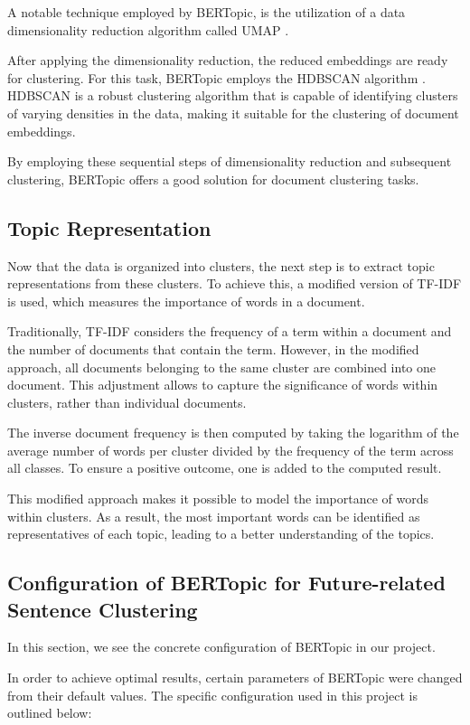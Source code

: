 \documentclass[a4paper,10pt]{report}
\begin{document}
A notable technique employed by BERTopic, is the utilization of a data dimensionality reduction algorithm called UMAP \cite{umap}.

After applying the dimensionality reduction, the reduced embeddings are ready for clustering. For this task, BERTopic employs the HDBSCAN algorithm \cite{hdbscan}. HDBSCAN is a robust clustering algorithm that is capable of identifying clusters of varying densities in the data, making it suitable for the clustering of document embeddings.

By employing these sequential steps of dimensionality reduction and subsequent clustering, BERTopic offers a good solution for document clustering tasks. \cite{bertopic}

\subsection{Topic Representation}
Now that the data is organized into clusters, the next step is to extract topic representations from these clusters. To achieve this, a modified version of TF-IDF is used, which measures the importance of words in a document.

Traditionally, TF-IDF considers the frequency of a term within a document and the number of documents that contain the term. However, in the modified approach, all documents belonging to the same cluster are combined into one document. This adjustment allows to capture the significance of words within clusters, rather than individual documents.

The inverse document frequency is then computed by taking the logarithm of the average number of words per cluster divided by the frequency of the term across all classes. To ensure a positive outcome, one is added to the computed result.

This modified approach makes it possible to model the importance of words within clusters. As a result, the most important words can be identified as representatives of each topic, leading to a better understanding of the topics. \cite{bertopic}

\subsection{Configuration of BERTopic for Future-related Sentence Clustering}
\label{bertopic_config}
In this section, we see the concrete configuration of BERTopic in our project.

In order to achieve optimal results, certain parameters of BERTopic were changed from their default values. The specific configuration used in this project is outlined below:
\end{document}
